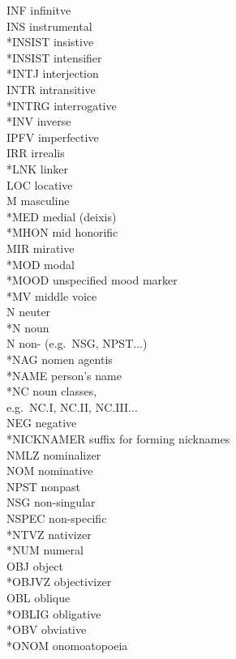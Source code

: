 \documentclass[a4paper, 11pt]{book}
\begin{document}
\begin{multicols}{2}
\begin{tabbing}
	INF \> infinitve \\
	INS \> instrumental \\
	*INSIST \> insistive \\
	*INSIST \> intensifier \\
	*INTJ \> interjection \\
	INTR \> intransitive \\
	*INTRG \> interrogative \\
	*INV \> inverse \\
	IPFV \> imperfective	\\
	IRR \> irrealis \\
	*LNK \> linker \\
	LOC \> locative \\
	M \> masculine \\
	*MED \> medial (deixis) \\
	*MHON \> mid honorific \\
	MIR \> mirative \\
	*MOD \> modal \\
	*MOOD \> unspecified mood marker \\
	*MV \> middle voice \\
	N \> neuter \\
	*N \> noun \\
	N \> non- (e.g.\ NSG, NPST...) \\
	*NAG \> nomen agentis \\
	*NAME \> person's name \\
	*NC \> noun classes, \\
		\> e.g.\ NC.I, NC.II, NC.III... \\
	NEG \> negative \\
	*NICKNAMER \> suffix for forming nicknames \\
	NMLZ \> nominalizer \\
	NOM \> nominative \\
	NPST \> nonpast \\
	NSG \> non-singular \\
	NSPEC \> non-specific \\
	*NTVZ \> nativizer \\
	*NUM \> numeral \\
	OBJ \> object \\
	*OBJVZ \> objectivizer \\
	OBL \> oblique \\
	*OBLIG \> obligative \\
	*OBV \> obviative \\
	*ONOM \> onomoatopoeia \\

\end{tabbing}
\end{multicols}
\end{document}
